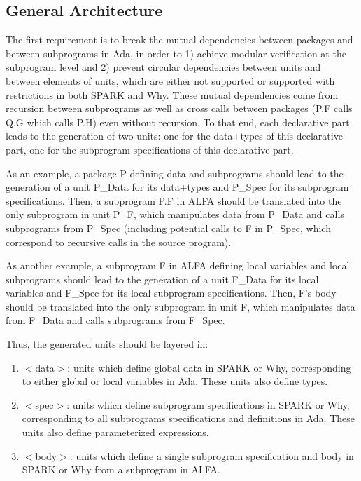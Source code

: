 \documentclass{article}
\begin{document}
\subsection{General Architecture}

The first requirement is to break the mutual dependencies between packages and
between subprograms in Ada, in order to 1) achieve modular verification at the
subprogram level and 2) prevent circular dependencies between units and between
elements of units, which are either not supported or supported with
restrictions in both SPARK and Why. These mutual dependencies come from
recursion between subprograms as well as cross calls between packages (P.F
calls Q.G which calls P.H) even without recursion. To that end, each
declarative part leads to the generation of two units: one for the data+types
of this declarative part, one for the subprogram specifications of this
declarative part.

As an example, a package P defining data and subprograms should lead to the
generation of a unit P\_Data for its data+types and P\_Spec for its subprogram
specifications. Then, a subprogram P.F in ALFA should be translated into the
only subprogram in unit P\_F, which manipulates data from P\_Data and calls
subprograms from P\_Spec (including potential calls to F in P\_Spec, which
correspond to recursive calls in the source program).

As another example, a subprogram F in ALFA defining local variables and local
subprograms should lead to the generation of a unit F\_Data for its local
variables and F\_Spec for its local subprogram specifications. Then, F's body
should be translated into the only subprogram in unit F, which manipulates data
from F\_Data and calls subprograms from F\_Spec.

Thus, the generated units should be layered in:
\begin{enumerate}
\item $<$data$>$: units which define global data in SPARK or Why, corresponding
  to either global or local variables in Ada. These units also define types.
\item $<$spec$>$: units which define subprogram specifications in SPARK or Why,
  corresponding to all subprograms specifications and definitions in Ada. These
  units also define parameterized expressions.
\item $<$body$>$: units which define a single subprogram specification and body
  in SPARK or Why from a subprogram in ALFA.
\end{enumerate}
\end{document}
